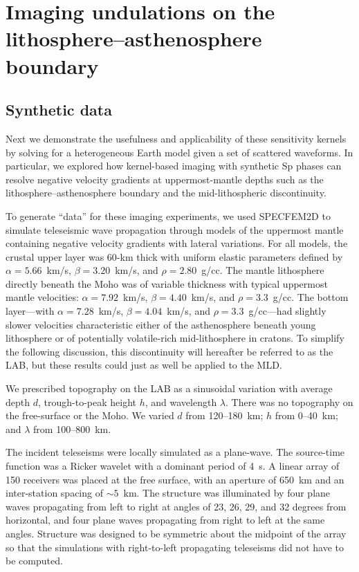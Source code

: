 \documentclass[referee]{gji}
\begin{document}
\section{Imaging undulations on the lithosphere--asthenosphere boundary}
\label{Section2}

\subsection{Synthetic data}

Next we demonstrate the usefulness and applicability of these sensitivity kernels by solving for a heterogeneous Earth model given a set of scattered waveforms.
In particular, we explored how kernel-based imaging with synthetic Sp phases can resolve negative velocity gradients at uppermost-mantle depths such as the lithosphere--asthenosphere boundary and the mid-lithospheric discontinuity.

To generate ``data'' for these imaging experiments, we used SPECFEM2D to simulate teleseismic wave propagation through models of the uppermost mantle containing negative velocity gradients with lateral variations.  For all models, the crustal upper layer was 60-km thick with uniform elastic parameters defined by $\alpha=5.66$~km/s, $\beta=3.20$~km/s, and $\rho=2.80$~g/cc.  The mantle lithosphere directly beneath the Moho was of variable thickness with typical uppermost mantle velocities: $\alpha=7.92$~km/s, $\beta=4.40$~km/s, and $\rho=3.3$~g/cc.  The bottom layer---with $\alpha=7.28$~km/s, $\beta=4.04$~km/s, and $\rho=3.3$~g/cc---had slightly slower velocities characteristic either of the asthenosphere beneath young lithosphere or of potentially volatile-rich mid-lithosphere in cratons.  To simplify the following discussion, this discontinuity will hereafter be referred to as the LAB, but these results could just as well be applied to the MLD.

We prescribed topography on the LAB as a sinusoidal variation with average depth $d$, trough-to-peak height $h$, and wavelength $\lambda$.  There was no topography on the free-surface or the Moho.  We varied $d$ from 120--180~km; $h$ from 0--40~km; and $\lambda$ from 100--800~km.

The incident teleseisms were locally simulated as a plane-wave.  The source-time function was a Ricker wavelet with a dominant period of 4~s.  A linear array of 150 receivers was placed at the free surface, with an aperture of 650~km and an inter-station spacing of $\sim5$~km.  The structure was illuminated by four plane waves propagating from left to right at angles of 23, 26, 29, and 32 degrees from horizontal, and four plane waves propagating from right to left at the same angles.  Structure was designed to be symmetric about the midpoint of the array so that the simulations with right-to-left propagating teleseisms did not have to be computed.  
\end{document}
